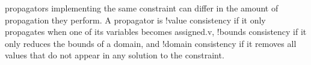 \Glspl{propagator} implementing the same \gls{constraint} can differ in the
amount of propagation they perform.
%
A \gls{propagator} is \glshyphened!{value consistency} if it only propagates
when one of its \glspl{variable} becomes \gls{assigned.v}, \glshyphened!{bounds
  consistency} if it only reduces the bounds of a \gls{domain}, and
\glshyphened!{domain consistency} if it removes all values that do not appear in
any \gls{solution} to the \gls{constraint}.
%
\begin{figure}
  \centering%
  \figureFont\figureFontSize%
\end{figure}
